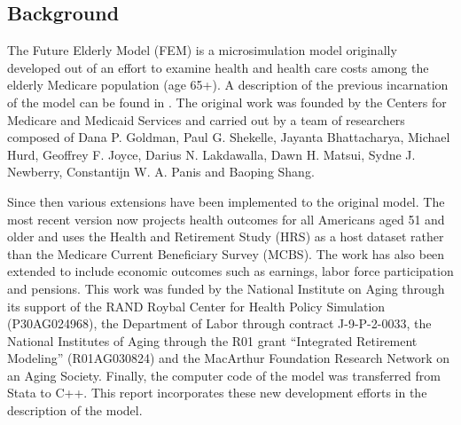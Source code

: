 \subsection{Background}
The Future Elderly Model (FEM) is a microsimulation model originally developed out of an effort to 
examine health and health care costs among the elderly Medicare population (age 65+). A description 
of the previous incarnation of the model can be found in \citet{goldman2004health}. The original work was 
founded by the Centers for Medicare and Medicaid Services and carried out by a team of researchers 
composed of Dana P. Goldman, Paul G. Shekelle, Jayanta Bhattacharya, Michael Hurd, Geoffrey F. Joyce, 
Darius N. Lakdawalla, Dawn H. Matsui, Sydne J. Newberry, Constantijn W. A. Panis and Baoping Shang.

Since then various extensions have been implemented to the original model. The most recent version 
now projects health outcomes for all Americans aged 51 and older and uses the Health and Retirement 
Study (HRS) as a host dataset rather than the Medicare Current Beneficiary Survey (MCBS).  The work 
has also been extended to include economic outcomes such as earnings, labor force participation and 
pensions. This work was funded by the National Institute on Aging through its support of the RAND 
Roybal Center for Health Policy Simulation (P30AG024968), the Department of Labor through contract 
J-9-P-2-0033, the National Institutes of Aging through the R01 grant ``Integrated Retirement 
Modeling'' (R01AG030824) and the MacArthur Foundation Research Network on an Aging Society. Finally, 
the computer code of the model was transferred from Stata to C++. This report incorporates these new 
development efforts in the description of the model.
